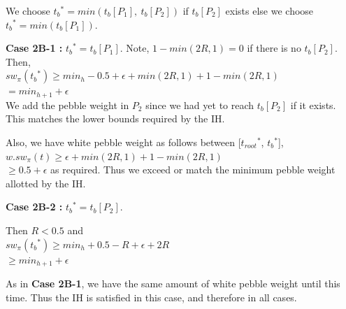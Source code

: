\documentclass[oribib1]{llncs}
\newcommand{\troots}{{t_{root}}^*}
\newcommand{\tbs}{{t_b}^{*}}
\newcommand{\tbtwo}{t_b[{P_2}]}
\newcommand{\tblast}{t_b[{P_1}]}
\begin{document}
\medskip


We choose $\tbs=min(\tblast,~\tbtwo)$ if $\tbtwo$ exists else we choose $\tbs=min(\tblast)$.

\bigskip

\noindent
{\bf Case 2B-1 :} $\tbs = \tblast$. Note, $1-min(2R,1) = 0$ if there is no $\tbtwo$. Then,\\
$sw_\pi(\tbs) \geq min_h -0.5 +\epsilon+ min(2R,1)+ 1-min(2R,1)$\\
$= min_{h+1} + \epsilon$\\
We add the pebble weight in $P_2$ since we had yet to reach $\tbtwo$ if it exists. This matches the lower bounds required by the IH.

Also, we have white pebble weight as follows between [$\troots$, $\tbs$],\\
$w.sw_\pi(t) \geq \epsilon + min(2R,1)+ 1 -min(2R,1)$\\
$\geq 0.5 + \epsilon$ as required. Thus we exceed or match the minimum pebble weight allotted by the IH.

\medskip

\noindent
{\bf Case 2B-2 :} $\tbs = \tbtwo$. 

Then $R< 0.5$ and\\
$sw_\pi(\tbs) \geq min_h+0.5-R+ \epsilon+ 2R$\\
$\geq min_{h+1} + \epsilon$

\medskip

As in {\bf Case 2B-1}, we have the same amount of white pebble weight until
this time. Thus the IH is satisfied in this case, and therefore in all cases.




%
%

\end{document}
